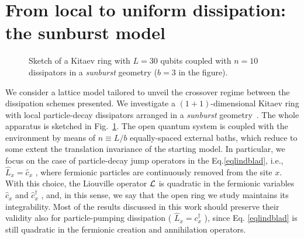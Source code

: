 \section{From local to uniform dissipation: the sunburst model}


\begin{figure}
    \centering
{}
    \caption{Sketch of a Kitaev ring with $L=30$ qubits coupled with $n=10$ dissipators in a \textit{sunburst} geometry ($b=3$ in the figure).}
    \label{fig_sketch_sunburst_dissipation}
\end{figure}

We consider a lattice model tailored to unveil the crossover regime between the  dissipation schemes presented. We investigate a $(1+1)$-dimensional Kitaev ring with local particle-decay dissipators arranged in a \textit{sunburst} geometry~\cite{FRV-staticsunburst, FRV-timesunburst, MS-2022-sunburstquench}. The whole apparatus is sketched in Fig.~\ref{fig_sketch_sunburst_dissipation}. The open quantum system is coupled with the environment by means of $n\equiv L/b$ equally-spaced external baths, which reduce to some extent the translation invariance of the starting model.
In particular, we focus on the case of particle-decay jump
operators in the Eq.\eqref{eqlindblad}, i.e., $\hat L_x = \hat c_x$ , where fermionic 
particles are continuously removed from the site $x$. With this choice,
the Liouville operator ${\cal L}$ is quadratic in the fermionic
variables $\hat c_x$ and $\hat c_x^\dagger$ , and, in this sense, we say that the
open ring we study maintains its integrability. Most of
the results discussed in this work should preserve their
validity also for particle-pumping dissipation ( $\hat L_x = c_x^\dagger$ ),
since Eq. \eqref{eqlindblad} is still quadratic in the fermionic creation
and annihilation operators.\\

